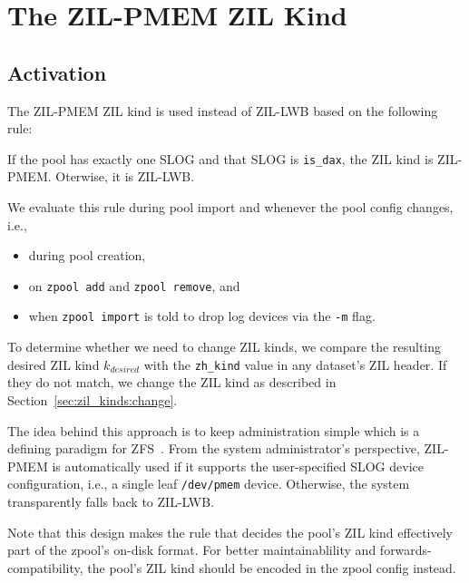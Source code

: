 \documentclass[12pt,a4paper,twoside]{book}
\begin{document}
\section{The ZIL-PMEM ZIL Kind}\label{sec:zilpmemzilkind}

\subsection{Activation}\label{sec:zilpmemzilkind:activation}
The ZIL-PMEM ZIL kind is used instead of ZIL-LWB based on the following rule:
\begin{displayquote}
  If the pool has exactly one SLOG and that SLOG is \lstinline{is_dax}, the ZIL kind is ZIL-PMEM. Oterwise, it is ZIL-LWB.
\end{displayquote}
We evaluate this rule during pool import and whenever the pool config changes, i.e.,
\begin{itemize}[noitemsep]
    \item during pool creation,
    \item on \texttt{zpool add} and \texttt{zpool remove}, and
    \item when \texttt{zpool import} is told to drop log devices via the \texttt{-m} flag.
\end{itemize}
To determine whether we need to change ZIL kinds, we compare the resulting desired ZIL kind $k_{desired}$ with the \lstinline{zh_kind} value in any dataset's ZIL header.
If they do not match, we change the ZIL kind as described in Section~\ref{sec:zil_kinds:change}.

The idea behind this approach is to keep administration simple which is a defining paradigm for ZFS~\cite{bonwickZettabyteFileSystem2003}.
From the system administrator's perspective, ZIL-PMEM is automatically used if it supports the user-specified SLOG device configuration, i.e., a single leaf \texttt{/dev/pmem} device.
Otherwise, the system transparently falls back to ZIL-LWB.

Note that this design makes the rule that decides the pool's ZIL kind effectively part of the zpool's on-disk format.
For better maintainablility and forwards-compatibility, the pool's ZIL kind should be encoded in the zpool config instead.

\end{document}
